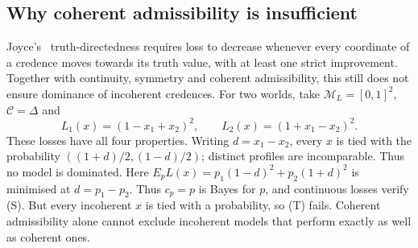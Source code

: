 \documentclass[11pt]{article}
\theoremstyle{definition}
\newcommand{\M}{\mathcal M}
\newcommand{\C}{\mathcal C}
\begin{document}
\subsection{Why coherent admissibility is insufficient}
Joyce's~\cite{Joyce2009} truth-directedness requires loss to decrease whenever every coordinate of a credence moves towards its truth value, with at least one strict improvement. Together with continuity, symmetry and coherent admissibility, this still does not ensure dominance of incoherent credences. For two worlds, take $\M_L=[0,1]^2$, $\C=\Delta$ and
\[
L_1(x)=(1-x_1+x_2)^2,\qquad L_2(x)=(1+x_1-x_2)^2.
\]
These losses have all four properties. Writing $d=x_1-x_2$, every $x$ is tied with the probability $((1+d)/2,(1-d)/2)$; distinct profiles are incomparable. Thus no model is dominated. Here $E_pL(x)=p_1(1-d)^2+p_2(1+d)^2$ is minimised at $d=p_1-p_2$. Thus $c_p=p$ is Bayes for $p$, and continuous losses verify (S). But every incoherent $x$ is tied with a probability, so (T) fails. Coherent admissibility alone cannot exclude incoherent models that perform exactly as well as coherent ones.
\end{document}
